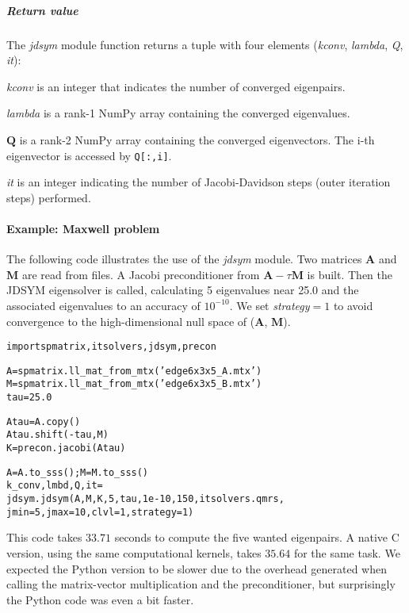 \documentclass[a4paper]{article}
\newcommand{\mat}[1]{\ensuremath{\boldsymbol{#1}}}
\newlength{\pyindent} \newlength{\pyminipagewidth}
\newenvironment{pycode}{\begin{trivlist}\item\hspace*{\pyindent}\begin{minipage}{\pyminipagewidth}\small\begin{alltt}}
      {\end{alltt}\end{minipage}\end{trivlist}}
\newenvironment{arglist} {\begin{list}{}{\setlength{\leftmargin}{4em}\setlength{\itemsep}{0cm}\setlength{\labelwidth}{3em}}}
  {\end{list}}
\begin{document}
\subparagraph{Return value}
%
\noindent The \textit{jdsym} module function returns a tuple with four elements
(\textit{kconv}, \textit{lambda}, \textit{Q}, \textit{it}):

\begin{arglist}
\item[\textit{kconv}] is an integer that indicates the number of
  converged eigenpairs.
\item[\textit{lambda}] is a rank-1 NumPy array containing the
  converged eigenvalues.
\item[$\mat{Q}$] is a rank-2 NumPy array containing the converged
  eigenvectors. The i-th eigenvector is accessed by \texttt{Q[:,i]}.
\item[\textit{it}] is an integer indicating the number of
  Jacobi-Davidson steps (outer iteration steps) performed.
\end{arglist}

\paragraph{Example: Maxwell problem}
The following code illustrates the use of the \textit{jdsym} module.
Two matrices $\mat{A}$ and $\mat{M}$ are read from files. A Jacobi
preconditioner from $\mat{A} - \tau\mat{M}$ is built. Then the JDSYM
eigensolver is called, calculating 5 eigenvalues near 25.0 and the
associated eigenvalues to an accuracy of $10^{-10}$.  We set
\textit{strategy}${}=1$ to avoid convergence to the high-dimensional
null space of ($\mat{A}$, $\mat{M}$).
\begin{pycode}
import spmatrix, itsolvers, jdsym, precon

A = spmatrix.ll_mat_from_mtx('edge6x3x5_A.mtx')
M = spmatrix.ll_mat_from_mtx('edge6x3x5_B.mtx')
tau = 25.0

Atau = A.copy()
Atau.shift(-tau, M)
K = precon.jacobi(Atau)

A = A.to_sss(); M = M.to_sss()
k_conv, lmbd, Q, it  = 
      jdsym.jdsym(A, M, K, 5, tau, 1e-10, 150, itsolvers.qmrs,
                  jmin=5, jmax=10, clvl=1, strategy=1)
\end{pycode}
This code takes $33.71$ seconds to compute the five wanted eigenpairs.
A native C version, using the same computational kernels, takes
$35.64$ for the same task. We expected the Python version to be slower
due to the overhead generated when calling the matrix-vector
multiplication and the preconditioner, but surprisingly the Python
code was even a bit faster.
\end{document}
